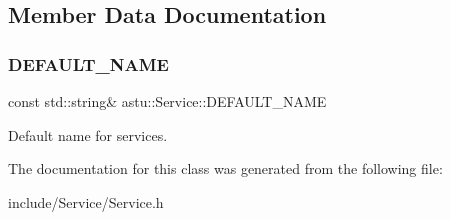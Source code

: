 \subsection{Member Data Documentation}
\mbox{\label{classastu_1_1Service_a8bb66bb984aa9490026232b193896634}} 
\subsubsection{\texorpdfstring{D\+E\+F\+A\+U\+L\+T\+\_\+\+N\+A\+ME}{DEFAULT\_NAME}}
{\footnotesize\ttfamily const std\+::string\& astu\+::\+Service\+::\+D\+E\+F\+A\+U\+L\+T\+\_\+\+N\+A\+ME\hspace{0.3cm}{\ttfamily [static]}}

Default name for services. 

The documentation for this class was generated from the following file\+:\begin{DoxyCompactItemize}
\item 
include/\+Service/Service.\+h\end{DoxyCompactItemize}
